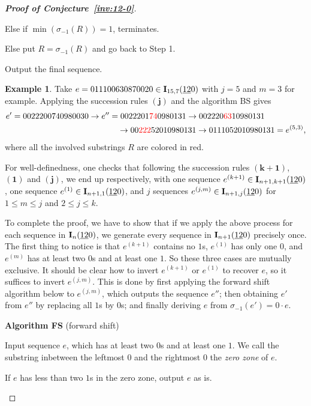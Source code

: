 \documentclass[12pt,A4]{amsart}
\numberwithin{equation}{section}
\def\red{\textcolor{red}}
\theoremstyle{plain}
\theoremstyle{definition}
\newtheorem{example}[theorem]{Example}
\def\I{\operatorname{{\bf I}}}
\begin{document}
\begin{proof}[{\bf Proof of Conjecture~\ref{inv:12-0}}]
\begin{framed}
\begin{itemize}
    Else if $\min(\sigma_{-1}(R))=1$, terminates.

    \quad Else put $R=\sigma_{-1}(R)$ and go back to Step 1.
\end{itemize}
\noindent Output the final sequence.

\begin{example} Take $e=011100630870020\in\I_{15,7}(\underline{12}0)$ with $j=5$ and $m=3$ for example. Applying the succession rules $\mathbf{(j)}$ and the algorithm BS gives
\begin{align*}
e'=0022200740980030\rightarrow e''&=0022201\red{74}0980131\rightarrow 002220\red{63}10980131\\
&\quad\rightarrow 00\red{222}52010980131\rightarrow 0111052010980131=e^{(5,3)},
\end{align*}
where all the involved substrings $R$ are colored in red.
\end{example}
\end{framed}
For well-definedness, one checks that following the succession rules $\mathbf{(k+1)}$, $\mathbf{(1)}$ and $\mathbf{(j)}$, we end up respectively, with one sequence $e^{(k+1)}\in\I_{n+1,k+1}(\underline{12}0)$, one sequence $e^{(1)}\in\I_{n+1,1}(\underline{12}0)$, and $j$ sequences $e^{(j,m)}\in\I_{n+1,j}(\underline{12}0)$ for $1\le m\le j$ and $2\le j\le k$.

To complete the proof, we have to show that if we apply the above process for each sequence in $\I_{n}(\underline{12}0)$, we generate every sequence in $\I_{n+1}(\underline{12}0)$ precisely once. The first thing to notice is that $e^{(k+1)}$ contains no $1$s, $e^{(1)}$ has only one $0$, and $e^{(m)}$ has at least two $0$s and at least one $1$. So these three cases are mutually exclusive. It should be clear how to invert $e^{(k+1)}$ or $e^{(1)}$ to recover $e$, so it suffices to invert $e^{(j,m)}$. This is done by first applying the forward shift algorithm below to $e^{(j,m)}$, which outputs the sequence $e''$; then obtaining  $e'$ from $e''$ by replacing all $1$s by $0$s; and finally  deriving $e$ from $\sigma_{-1}(e')=0\cdot e$.
\begin{framed}
\begin{center}
 {\bf Algorithm FS} (forward shift)
\end{center}
\noindent Input sequence $e$, which has at least two $0$s and at least one $1$. We call the substring inbetween the leftmost $0$ and the rightmost $0$ the {\em zero zone} of $e$.

If $e$ has less than two $1$s in the zero zone, output $e$ as is.


\end{framed}
\end{proof}
\end{document}
